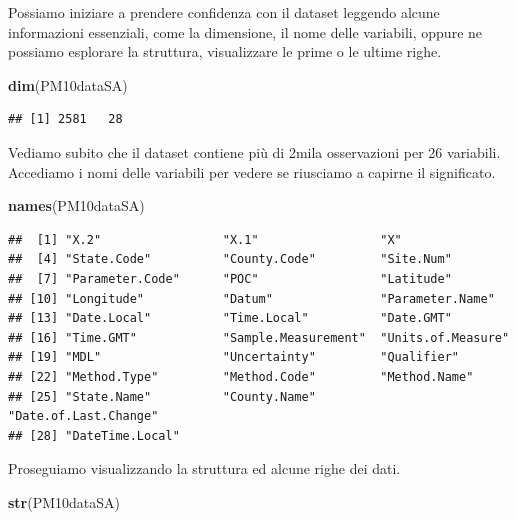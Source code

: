 \documentclass[]{book}
\newenvironment{Shaded}{\begin{snugshade}}{\end{snugshade}}
\newcommand{\KeywordTok}[1]{\textcolor[rgb]{0.13,0.29,0.53}{\textbf{#1}}}
\newcommand{\NormalTok}[1]{#1}
\begin{document}
Possiamo iniziare a prendere confidenza con il dataset leggendo alcune informazioni essenziali, come la dimensione, il nome delle variabili, oppure ne possiamo esplorare la struttura, visualizzare le prime o le ultime righe.

\begin{Shaded}
\begin{Highlighting}[]
\KeywordTok{dim}\NormalTok{(PM10dataSA)}
\end{Highlighting}
\end{Shaded}

\begin{verbatim}
## [1] 2581   28
\end{verbatim}

Vediamo subito che il dataset contiene più di 2mila osservazioni per 26 variabili. Accediamo i nomi delle variabili per vedere se riusciamo a capirne il significato.

\begin{Shaded}
\begin{Highlighting}[]
\KeywordTok{names}\NormalTok{(PM10dataSA)}
\end{Highlighting}
\end{Shaded}

\begin{verbatim}
##  [1] "X.2"                 "X.1"                 "X"                  
##  [4] "State.Code"          "County.Code"         "Site.Num"           
##  [7] "Parameter.Code"      "POC"                 "Latitude"           
## [10] "Longitude"           "Datum"               "Parameter.Name"     
## [13] "Date.Local"          "Time.Local"          "Date.GMT"           
## [16] "Time.GMT"            "Sample.Measurement"  "Units.of.Measure"   
## [19] "MDL"                 "Uncertainty"         "Qualifier"          
## [22] "Method.Type"         "Method.Code"         "Method.Name"        
## [25] "State.Name"          "County.Name"         "Date.of.Last.Change"
## [28] "DateTime.Local"
\end{verbatim}

Proseguiamo visualizzando la struttura ed alcune righe dei dati.

\begin{Shaded}
\begin{Highlighting}[]
\KeywordTok{str}\NormalTok{(PM10dataSA)}
\end{Highlighting}
\end{Shaded}
\end{document}
